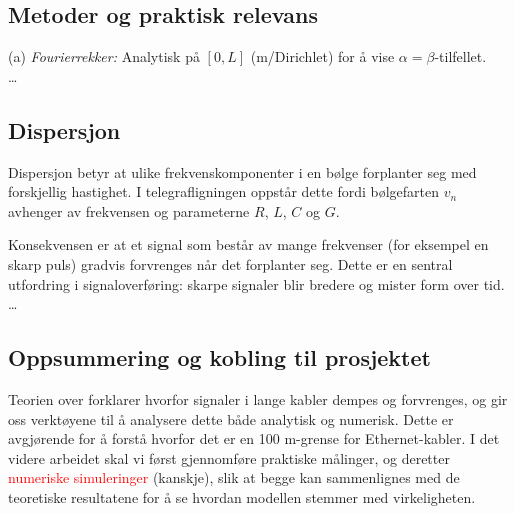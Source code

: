 \subsection{Metoder og praktisk relevans}

(a) \textit{Fourierrekker:} Analytisk på $[0,L]$ (m/Dirichlet) for å vise $\alpha=\beta$-tilfellet.\\
\dots
\clearpage
\subsection{Dispersjon}

Dispersjon betyr at ulike frekvenskomponenter i en bølge forplanter seg med forskjellig hastighet. 
I telegrafligningen oppstår dette fordi bølgefarten $v_n$ avhenger av frekvensen og parameterne 
$R$, $L$, $C$ og $G$. 

Konsekvensen er at et signal som består av mange frekvenser (for eksempel en skarp puls) gradvis 
forvrenges når det forplanter seg. Dette er en sentral utfordring i signaloverføring: skarpe signaler 
blir bredere og mister form over tid. 
\dots

\subsection{Oppsummering og kobling til prosjektet}

Teorien over forklarer hvorfor signaler i lange kabler dempes og forvrenges, og gir oss verktøyene til å analysere dette både analytisk og numerisk. Dette er avgjørende for å forstå hvorfor det er en 100 m-grense for Ethernet-kabler. I det videre arbeidet skal vi først gjennomføre praktiske målinger, og deretter \textcolor{red}{numeriske simuleringer} (kanskje), slik at begge kan sammenlignes med de teoretiske resultatene for å se hvordan modellen stemmer med virkeligheten.

